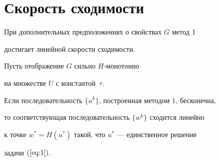 \section{Скорость сходимости}





При дополнительных предположениях о свойствах $G$ метод 1 


достигает линейной скорости сходимости.








\begin{thm} \label{thm:2}


Пусть отображение $G$ сильно $H$-монотонно 


на множестве $U$ с константой~$\tau$. 


Если последовательность $\{ u^{k} \}$, построенная методом $1$, бесконечна, 


то соответствующая последовательность $\{ w^{k} \}$ сходится линейно 


к точке $ w^{*}=H(u^{*}) $ такой, что $u^{*}$ --- единственное решение 


задачи $(\ref{eq:1})$. 


\end{thm}





